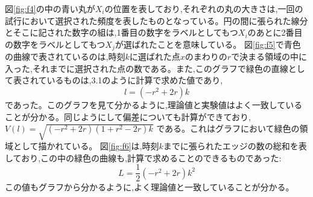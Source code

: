 図\ref{fig:f4}の中の青い丸が$X_{i}$の位置を表しており,それぞれの丸の大きさは,一回の試行において選択された頻度を表したものとなっている。円の間に張られた線分とそこに記された数字の組は,1番目の数字をラベルとしてもつ$X_{i}$のあとに2番目の数字をラベルとしてもつ$X_{j}$が選ばれたことを意味している。
図\ref{fig:f5}で青色の曲線で表されているのは,時刻$k$に選ばれた点$x$のまわりの$r$で決まる領域の中に入った,それまでに選択された点の数である。また,このグラフで緑色の直線として表されているものは,3.1のように計算で求めた値であり,
\[l = (-r^{2} + 2r)k\]
であった。このグラフを見て分かるように,理論値と実験値はよく一致していることが分かる。同じようにして偏差についても計算ができており,
$V(l) = \sqrt{(-r^{2} + 2r)(1+r^{2}-2r)k}$
である。これはグラフにおいて緑色の領域として描かれている。
図\ref{fig:f6}は,時刻$k$までに張られたエッジの数の総和を表しており,この中の緑色の曲線も,計算で求めることのできるものであった:
\[L = \frac{1}{2}(-r^{2} + 2r)k^{2}\]
この値もグラフから分かるように,よく理論値と一致していることが分かる。

